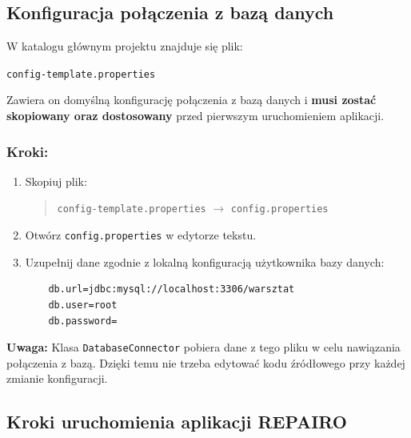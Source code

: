 \subsection{Konfiguracja połączenia z bazą danych}

W katalogu głównym projektu znajduje się plik:

\begin{center}
\texttt{config-template.properties}
\end{center}

Zawiera on domyślną konfigurację połączenia z bazą danych i \textbf{musi zostać skopiowany oraz dostosowany} przed pierwszym uruchomieniem aplikacji.

\subsubsection*{Kroki:}
\begin{enumerate}
  \item Skopiuj plik:
  \begin{quote}
    \texttt{config-template.properties} \(\rightarrow\) \texttt{config.properties}
  \end{quote}
  \item Otwórz \texttt{config.properties} w edytorze tekstu.
  \newpage\item Uzupełnij dane zgodnie z lokalną konfiguracją użytkownika bazy danych:
\begin{verbatim}
    db.url=jdbc:mysql://localhost:3306/warsztat
    db.user=root
    db.password=
\end{verbatim}
\end{enumerate}

\noindent
\textbf{Uwaga:} Klasa \texttt{DatabaseConnector} pobiera dane z tego pliku w celu nawiązania połączenia z bazą. Dzięki temu nie trzeba edytować kodu źródłowego przy każdej zmianie konfiguracji.

\subsection{Kroki uruchomienia aplikacji REPAIRO}

